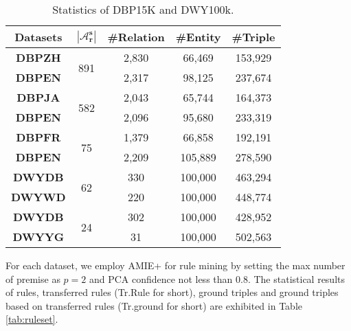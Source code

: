 \documentclass[11pt,a4paper]{article}
\begin{document}
\begin{table}[htbp]
	\centering
	\setlength{\tabcolsep}{1.0pt}
	\small
	\renewcommand{\arraystretch}{1.0}
	\begin{tabular}{ccccc}
		\toprule
		\textbf{Datasets}      & $\mathbf{|\mathcal{A}_r^s|}$      & \#\textbf{Relation} & \#\textbf{Entity}  & \#\textbf{Triple}  \\
		\midrule
		\textbf{DBP{\tiny ZH}} & \multirow{2}[2]{*}{891 } & 2,830    & 66,469  & 153,929 \\
		\textbf{DBP{\tiny EN}} &                          & 2,317    & 98,125  & 237,674 \\
		\midrule
		\textbf{DBP{\tiny JA}} & \multirow{2}[2]{*}{582 } & 2,043    & 65,744  & 164,373 \\
		\textbf{DBP{\tiny EN}} &                          & 2,096    & 95,680  & 233,319 \\
		\midrule
		\textbf{DBP{\tiny FR}} & \multirow{2}[2]{*}{75 }  & 1,379    & 66,858  & 192,191 \\
		\textbf{DBP{\tiny EN}} &                          & 2,209    & 105,889 & 278,590 \\
		\midrule
		\textbf{DWY{\tiny DB}} & \multirow{2}[2]{*}{62 }  & 330      & 100,000 & 463,294 \\
		\textbf{DWY{\tiny WD}} &                          & 220      & 100,000 & 448,774 \\
		\midrule
		\textbf{DWY{\tiny DB}} & \multirow{2}[2]{*}{24 }  & 302      & 100,000 & 428,952 \\
		\textbf{DWY{\tiny YG}} &                          & 31       & 100,000 & 502,563 \\
		\bottomrule
	\end{tabular}\caption{Statistics of DBP15K and DWY100k.}
	\label{tab:dataset}\end{table}

For each dataset, we employ AMIE+ for rule mining by setting the max number of premise as $p=2$ and PCA confidence not less than $0.8$. The statistical results of rules, transferred rules (Tr.Rule for short), ground triples and ground triples based on transferred rules (Tr.ground for short) are exhibited in Table \ref{tab:ruleset}.
\end{document}
